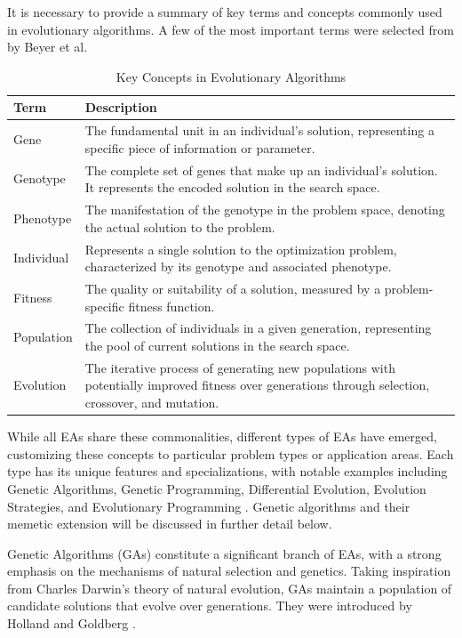\documentclass[twoside]{ctuthesis}
\theoremstyle{plain}
\theoremstyle{definition}
\theoremstyle{note}
\begin{document}
It is necessary to provide a summary of key terms and concepts commonly used in evolutionary algorithms. A few of the most important terms were selected from \cite{glogs} by Beyer et al.
\begin{table}[htbp]
	\caption{Key Concepts in Evolutionary Algorithms}
	\label{tab:key-concepts}
	\begin{tabularx}{\textwidth}{lX}
		\hline
		\textbf{Term} & \textbf{Description} \\
		\hline
		Gene & The fundamental unit in an individual's solution, representing a specific piece of information or parameter. \\
		Genotype & The complete set of genes that make up an individual's solution. It represents the encoded solution in the search space. \\
		Phenotype & The manifestation of the genotype in the problem space, denoting the actual solution to the problem. \\
		Individual & Represents a single solution to the optimization problem, characterized by its genotype and associated phenotype. \\
		Fitness & The quality or suitability of a solution, measured by a problem-specific fitness function. \\
		Population & The collection of individuals in a given generation, representing the pool of current solutions in the search space. \\
		Evolution & The iterative process of generating new populations with potentially improved fitness over generations through selection, crossover, and mutation. \\
		\hline
	\end{tabularx}
\end{table}


While all EAs share these commonalities, different types of EAs have emerged, customizing these concepts to particular problem types or application areas. Each type has its unique features and specializations, with notable examples including Genetic Algorithms, Genetic Programming, Differential Evolution, Evolution Strategies, and Evolutionary Programming \cite{marte2018handbook}. Genetic algorithms and their memetic extension will be discussed in further detail below.

Genetic Algorithms (GAs) constitute a significant branch of EAs, with a strong emphasis on the mechanisms of natural selection and genetics. Taking inspiration from Charles Darwin's theory of natural evolution, GAs maintain a population of candidate solutions that evolve over generations. They were introduced by Holland and Goldberg \cite{miller1995genetic}.
\end{document}

